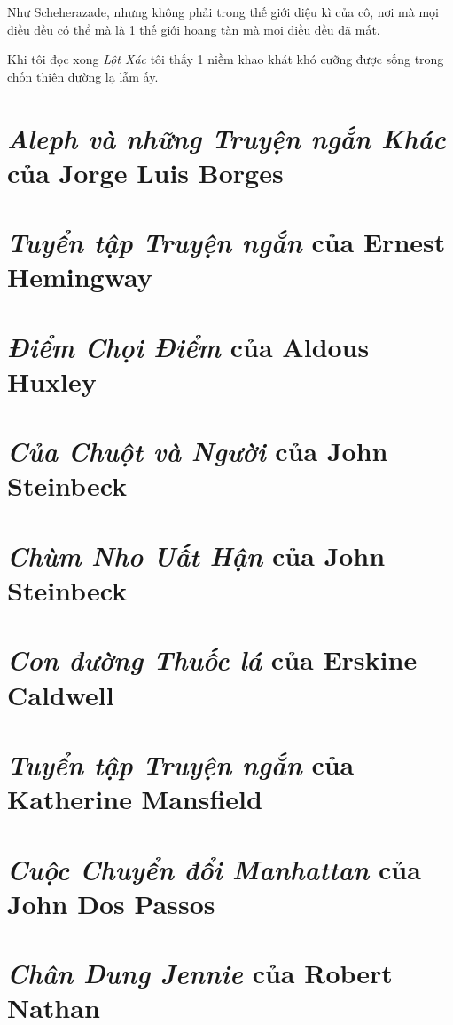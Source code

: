 \documentclass{book}
\numberwithin{equation}{section}
\begin{document}
Như Scheherazade, nhưng không phải trong thế giới diệu kì của cô, nơi mà mọi điều đều có thể mà là 1 thế giới hoang tàn mà mọi điều đều đã mất.

Khi tôi đọc xong \textit{Lột Xác} tôi thấy 1 niềm khao khát khó cưỡng được sống trong chốn thiên đường lạ lẫm ấy.

\section{\textit{Aleph và những Truyện ngắn Khác} của Jorge Luis Borges}

\section{\textit{Tuyển tập Truyện ngắn} của Ernest Hemingway}

\section{\textit{Điểm Chọi Điểm} của Aldous Huxley}

\section{\textit{Của Chuột và Người} của John Steinbeck}

\section{\textit{Chùm Nho Uất Hận} của John Steinbeck}

\section{\textit{Con đường Thuốc lá} của Erskine Caldwell}

\section{\textit{Tuyển tập Truyện ngắn} của Katherine Mansfield}

\section{\textit{Cuộc Chuyển đổi Manhattan} của John Dos Passos}

\section{\textit{Chân Dung Jennie} của Robert Nathan}
\end{document}
